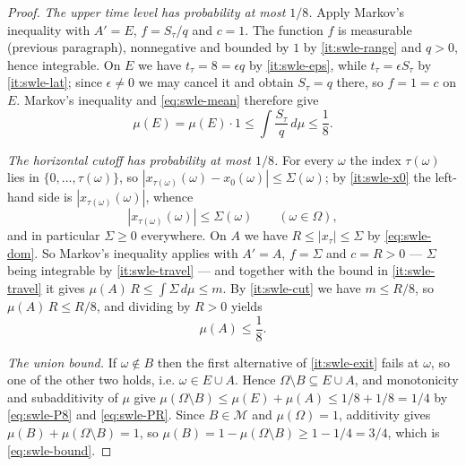\begin{proof}
\emph{The upper time level has probability at most $1/8$.} Apply Markov's
inequality with $A'=E$, $f=S_\tau/q$ and $c=1$. The function $f$ is measurable
(previous paragraph), nonnegative and bounded by $1$ by \ref{it:swle-range} and
$q>0$, hence integrable. On $E$ we have $t_\tau=8=\epsilon q$ by
\ref{it:swle-eps}, while $t_\tau=\epsilon S_\tau$ by \ref{it:swle-lat}; since
$\epsilon\ne0$ we may cancel it and obtain $S_\tau=q$ there, so $f=1=c$ on $E$.
Markov's inequality and \eqref{eq:swle-mean} therefore give
\begin{equation}\label{eq:swle-P8}
  \mu(E)=\mu(E)\cdot1\le\int\frac{S_\tau}{q}\,d\mu\le\frac18 .
\end{equation}

\emph{The horizontal cutoff has probability at most $1/8$.} For every $\omega$
the index $\tau(\omega)$ lies in $\{0,\ldots,\tau(\omega)\}$, so
$|x_{\tau(\omega)}(\omega)-x_0(\omega)|\le\Sigma(\omega)$; by \ref{it:swle-x0}
the left-hand side is $|x_{\tau(\omega)}(\omega)|$, whence
\begin{equation}\label{eq:swle-dom}
  |x_{\tau(\omega)}(\omega)|\le\Sigma(\omega)\qquad(\omega\in\Omega),
\end{equation}
and in particular $\Sigma\ge0$ everywhere. On $A$ we have
$R\le|x_\tau|\le\Sigma$ by \eqref{eq:swle-dom}. So Markov's inequality applies
with $A'=A$, $f=\Sigma$ and $c=R>0$ --- $\Sigma$ being integrable by
\ref{it:swle-travel} --- and together with the bound in \ref{it:swle-travel} it
gives $\mu(A)\,R\le\int\Sigma\,d\mu\le m$. By \ref{it:swle-cut} we have
$m\le R/8$, so $\mu(A)\,R\le R/8$, and dividing by $R>0$ yields
\begin{equation}\label{eq:swle-PR}
  \mu(A)\le\frac18 .
\end{equation}

\emph{The union bound.} If $\omega\notin B$ then the first alternative of
\ref{it:swle-exit} fails at $\omega$, so one of the other two holds, i.e.
$\omega\in E\cup A$. Hence $\Omega\setminus B\subseteq E\cup A$, and
monotonicity and subadditivity of $\mu$ give
$\mu(\Omega\setminus B)\le\mu(E)+\mu(A)\le1/8+1/8=1/4$ by
\eqref{eq:swle-P8} and \eqref{eq:swle-PR}. Since $B\in\mathcal M$ and
$\mu(\Omega)=1$, additivity gives $\mu(B)+\mu(\Omega\setminus B)=1$, so
$\mu(B)=1-\mu(\Omega\setminus B)\ge1-1/4=3/4$, which is
\eqref{eq:swle-bound}.
\end{proof}
